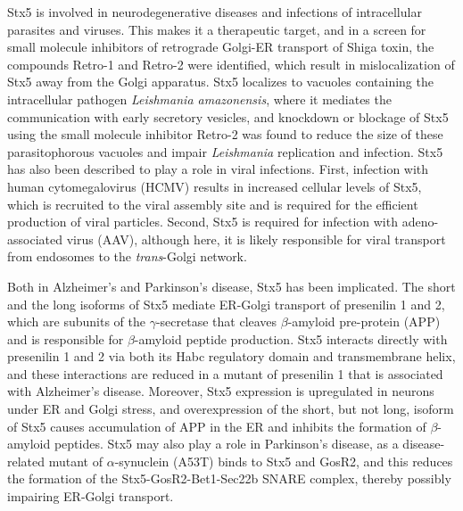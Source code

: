 Stx5 is involved in neurodegenerative diseases and infections of intracellular parasites and viruses. This makes it a therapeutic target, and in a screen for small molecule inhibitors of retrograde Golgi-ER transport of Shiga toxin, the compounds Retro-1 and Retro-2 were identified, which result in mislocalization of Stx5 away from the Golgi apparatus\cite{canton_targeting_2012,stechmann_inhibition_2010}. Stx5 localizes to vacuoles containing the intracellular pathogen \emph{Leishmania amazonensis}, where it mediates the communication with early secretory vesicles, and knockdown or blockage of Stx5 using the small molecule inhibitor Retro-2 was found to reduce the size of these parasitophorous vacuoles and impair \emph{Leishmania} replication and infection\cite{canton_targeting_2012,canton_disruption_2012}. Stx5 has also been described to play a role in viral infections. First, infection with human cytomegalovirus (HCMV) results in increased cellular levels of Stx5, which is recruited to the viral assembly site and is required for the efficient production of viral particles\cite{cruz_potent_2017}. Second, Stx5 is required for infection with adeno-associated virus (AAV), although here, it is likely responsible for viral transport from endosomes to the \emph{trans}-Golgi network\cite{nonnenmacher_syntaxin_2015}.

Both in Alzheimer’s and Parkinson’s disease, Stx5 has been implicated. The short and the long isoforms of Stx5 mediate ER-Golgi transport of presenilin 1 and 2, which are subunits of the $\gamma$-secretase that cleaves $\beta$-amyloid pre-protein (APP) and is responsible for $\beta$-amyloid peptide production\cite{suga_syntaxin_2009,suga_syntaxin_2004,suga_syntaxin_2005}. Stx5 interacts directly with presenilin 1 and 2 via both its Habc regulatory domain and transmembrane helix, and these interactions are reduced in a mutant of presenilin 1 that is associated with Alzheimer’s disease\cite{suga_syntaxin_2009,suga_syntaxin_2004,suga_syntaxin_2005}. Moreover, Stx5 expression is upregulated in neurons under ER and Golgi stress\cite{suga_er_2015}, and overexpression of the short, but not long, isoform of Stx5 causes accumulation of APP in the ER and inhibits the formation of $\beta$-amyloid peptides\cite{suga_syntaxin_2009,suga_syntaxin_2005,suga_er_2015}. Stx5 may also play a role in Parkinson’s disease, as a disease-related mutant of $\alpha$-synuclein (A53T) binds to Stx5 and GosR2, and this reduces the formation of the Stx5-GosR2-Bet1-Sec22b SNARE complex, thereby possibly impairing ER-Golgi transport\cite{thayanidhi_-synuclein_2010}.

